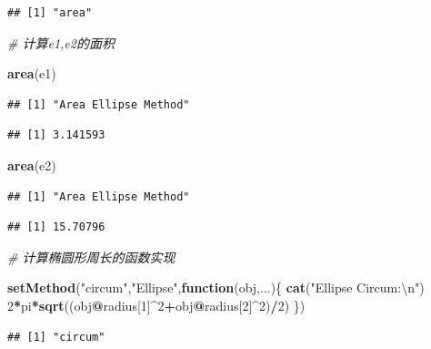 \documentclass[]{book}
\newenvironment{Shaded}{\begin{snugshade}}{\end{snugshade}}
\newcommand{\KeywordTok}[1]{\textcolor[rgb]{0.13,0.29,0.53}{\textbf{#1}}}
\newcommand{\DecValTok}[1]{\textcolor[rgb]{0.00,0.00,0.81}{#1}}
\newcommand{\CharTok}[1]{\textcolor[rgb]{0.31,0.60,0.02}{#1}}
\newcommand{\StringTok}[1]{\textcolor[rgb]{0.31,0.60,0.02}{#1}}
\newcommand{\CommentTok}[1]{\textcolor[rgb]{0.56,0.35,0.01}{\textit{#1}}}
\newcommand{\ControlFlowTok}[1]{\textcolor[rgb]{0.13,0.29,0.53}{\textbf{#1}}}
\newcommand{\OperatorTok}[1]{\textcolor[rgb]{0.81,0.36,0.00}{\textbf{#1}}}
\newcommand{\NormalTok}[1]{#1}
\begin{document}
\begin{verbatim}
## [1] "area"
\end{verbatim}

\begin{Shaded}
\begin{Highlighting}[]
\CommentTok{# 计算e1,e2的面积}

\KeywordTok{area}\NormalTok{(e1)}
\end{Highlighting}
\end{Shaded}

\begin{verbatim}
## [1] "Area Ellipse Method"
\end{verbatim}

\begin{verbatim}
## [1] 3.141593
\end{verbatim}

\begin{Shaded}
\begin{Highlighting}[]
\KeywordTok{area}\NormalTok{(e2)}
\end{Highlighting}
\end{Shaded}

\begin{verbatim}
## [1] "Area Ellipse Method"
\end{verbatim}

\begin{verbatim}
## [1] 15.70796
\end{verbatim}

\begin{Shaded}
\begin{Highlighting}[]
\CommentTok{# 计算椭圆形周长的函数实现}

\KeywordTok{setMethod}\NormalTok{(}\StringTok{"circum"}\NormalTok{,}\StringTok{"Ellipse"}\NormalTok{,}\ControlFlowTok{function}\NormalTok{(obj,...)\{}
  \KeywordTok{cat}\NormalTok{(}\StringTok{"Ellipse Circum:}\CharTok{\textbackslash{}n}\StringTok{"}\NormalTok{)}
  \DecValTok{2}\OperatorTok{*}\NormalTok{pi}\OperatorTok{*}\KeywordTok{sqrt}\NormalTok{((obj}\OperatorTok{@}\NormalTok{radius[}\DecValTok{1}\NormalTok{]}\OperatorTok{^}\DecValTok{2}\OperatorTok{+}\NormalTok{obj}\OperatorTok{@}\NormalTok{radius[}\DecValTok{2}\NormalTok{]}\OperatorTok{^}\DecValTok{2}\NormalTok{)}\OperatorTok{/}\DecValTok{2}\NormalTok{)}
\NormalTok{\})}
\end{Highlighting}
\end{Shaded}

\begin{verbatim}
## [1] "circum"
\end{verbatim}
\end{document}
